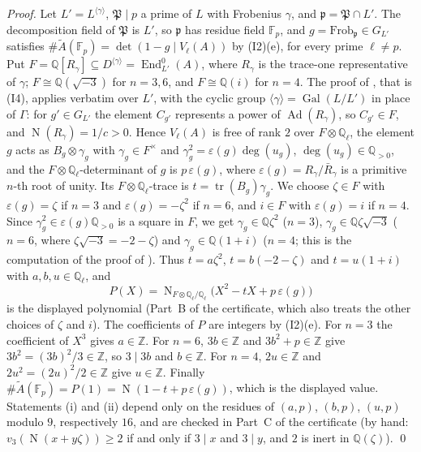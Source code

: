 \documentclass[11pt]{article}
\newcommand{\Q}{\mathbb Q}
\newcommand{\Z}{\mathbb Z}
\newcommand{\F}{\mathbb F}
\DeclareMathOperator{\End}{End}
\DeclareMathOperator{\Gal}{Gal}
\DeclareMathOperator{\Norm}{N}
\DeclareMathOperator{\Ad}{Ad}
\DeclareMathOperator{\tr}{tr}
\begin{document}
\emph{Proof.} Let \(L'=L^{\langle\gamma\rangle}\), \(\mathfrak P\mid p\) a prime of \(L\) with Frobenius
\(\gamma\), and \(\mathfrak p=\mathfrak P\cap L'\). The decomposition field of \(\mathfrak P\) is \(L'\), so
\(\mathfrak p\) has residue field \(\F_p\), and \(g=\mathrm{Frob}_{\mathfrak p}\in G_{L'}\) satisfies
\(\#\widetilde A(\F_p)=\det(1-g\mid V_\ell(A))\) by (I2)(e), for every prime \(\ell\neq p\). Put
\(F=\Q[R_\gamma]\subseteq D^{\langle\gamma\rangle}=\End^0_{L'}(A)\), where \(R_\gamma\) is the trace-one
representative of \(\gamma\); \(F\cong\Q(\sqrt{-3})\) for \(n=3,6\), and \(F\cong\Q(i)\) for \(n=4\). The proof of
\cite[Lemma~3]{P2214}, that is (I4), applies verbatim over \(L'\), with the cyclic group
\(\langle\gamma\rangle=\Gal(L/L')\) in place of \(\Gamma\): for \(g'\in G_{L'}\) the element \(C_{g'}\) represents a
power of \(\Ad(R_\gamma)\), so \(C_{g'}\in F\), and \(\Norm(R_\gamma)=1/c>0\). Hence \(V_\ell(A)\) is free of rank
\(2\) over \(F\otimes\Q_\ell\), the element \(g\) acts as \(B_g\otimes\gamma_g\) with \(\gamma_g\in F^\times\) and
\(\gamma_g^2=\varepsilon(g)\deg(u_g)\), \(\deg(u_g)\in\Q_{>0}\), and the \(F\otimes\Q_\ell\)-determinant of \(g\) is
\(p\,\varepsilon(g)\), where \(\varepsilon(g)=R_\gamma/\bar R_\gamma\) is a primitive \(n\)-th root of unity. Its
\(F\otimes\Q_\ell\)-trace is \(t=\tr(B_g)\gamma_g\). We choose \(\zeta\in F\) with \(\varepsilon(g)=\zeta\) if
\(n=3\) and \(\varepsilon(g)=-\zeta^2\) if \(n=6\), and \(i\in F\) with \(\varepsilon(g)=i\) if \(n=4\). Since
\(\gamma_g^2\in\varepsilon(g)\Q_{>0}\) is a square in \(F\), we get \(\gamma_g\in\Q\zeta^2\) (\(n=3\)),
\(\gamma_g\in\Q\zeta\sqrt{-3}\) (\(n=6\), where \(\zeta\sqrt{-3}=-2-\zeta\)) and \(\gamma_g\in\Q(1+i)\) (\(n=4\);
this is the computation of the proof of \cite[Proposition~A]{P2210}). Thus \(t=a\zeta^2\), \(t=b(-2-\zeta)\) and
\(t=u(1+i)\) with \(a,b,u\in\Q_\ell\), and
\[P(X)=\Norm_{F\otimes\Q_\ell/\Q_\ell}\bigl(X^2-tX+p\,\varepsilon(g)\bigr)\]
is the displayed polynomial (Part~B of the certificate, which also treats the other choices of \(\zeta\) and
\(i\)). The coefficients of \(P\) are integers by (I2)(e). For \(n=3\) the coefficient of \(X^3\) gives
\(a\in\Z\). For \(n=6\), \(3b\in\Z\) and \(3b^2+p\in\Z\) give \(3b^2=(3b)^2/3\in\Z\), so \(3\mid3b\) and
\(b\in\Z\). For \(n=4\), \(2u\in\Z\) and \(2u^2=(2u)^2/2\in\Z\) give \(u\in\Z\). Finally
\(\#\widetilde A(\F_p)=P(1)=\Norm(1-t+p\,\varepsilon(g))\), which is the displayed value. Statements (i) and (ii)
depend only on the residues of \((a,p)\), \((b,p)\), \((u,p)\) modulo \(9\), respectively \(16\), and are checked in
Part~C of the certificate (by hand: \(v_3(\Norm(x+y\zeta))\ge2\) if and only if \(3\mid x\) and \(3\mid y\), and
\(2\) is inert in \(\Q(\zeta)\)). \qed
\end{document}
